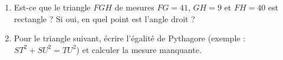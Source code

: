 
\begin{exercice}\label{exosmath-0985}

    \begin{enumerate}
        \item
            Est-ce que le triangle \( FGH\) de mesures \( FG=41\), \( GH=9\) et \( FH=40\) est rectangle ? Si oui, en quel point est l'angle droit ?
        \item
            Pour le triangle suivant, écrire l'égalité de Pythagore (exemple : \( ST^2+SU^2=TU^2\)) et calculer la mesure manquante.
            \begin{center}
   
            \end{center}
    \end{enumerate}


\end{exercice}

